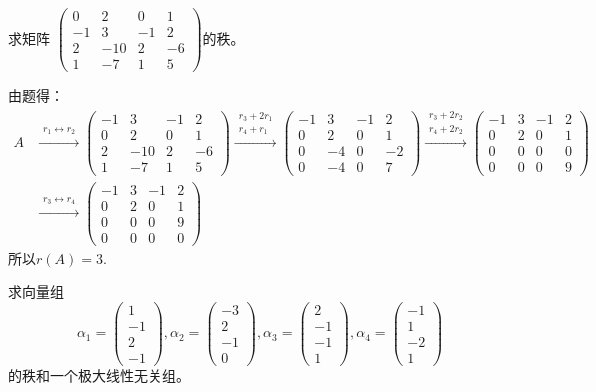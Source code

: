 \documentclass[a4paper]{report}
\begin{document}
\EX 求矩阵
$
\begin{pmatrix}
0&2&0&1\\ -1&3&-1&2\\ 2&-10&2&-6\\ 1&-7&1&5
\end{pmatrix}
$的秩。

\begin{jie}
由题得：
\begin{align*}
A&\xrightarrow{\substack{r_{1}\leftrightarrow r_2}}{
\begin{pmatrix}
-1&3&-1&2\\ 0&2&0&1\\ 2&-10&2&-6\\ 1&-7&1&5
\end{pmatrix}
}\xrightarrow{\substack{r_{3}+2r_1 \\ r_4+r_1}}{
\begin{pmatrix}
-1&3&-1&2\\ 0&2&0&1\\ 0&-4&0&-2\\ 0&-4&0&7
\end{pmatrix}
}\xrightarrow{\substack{r_{3}+2r_2 \\ r_4+2r_2}}{
\begin{pmatrix}
-1&3&-1&2\\ 0&2&0&1\\ 0&0&0&0\\ 0&0&0&9
\end{pmatrix}
}\\
&\xrightarrow{\substack{r_{3}\leftrightarrow r_4}}{
\begin{pmatrix}
-1&3&-1&2\\ 0&2&0&1\\  0&0&0&9\\0&0&0&0
\end{pmatrix}
}
\end{align*}
所以$r(A)=3$.
\end{jie}

\EX 求向量组
\begin{equation*}
\alpha_1=
\begin{pmatrix}
1\\ -1\\ 2\\ -1
\end{pmatrix},
\alpha_2=
\begin{pmatrix}
-3\\ 2\\ -1\\ 0
\end{pmatrix},
\alpha_3=
\begin{pmatrix}
2\\ -1\\-1\\ 1
\end{pmatrix},
\alpha_4=
\begin{pmatrix}
-1\\ 1\\ -2\\ 1
\end{pmatrix}
\end{equation*}
的秩和一个极大线性无关组。
\end{document}
